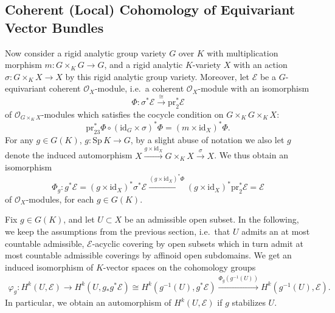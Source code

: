 \documentclass[a4paper, reqno, 10pt]{amsart}
\theoremstyle{definition}
\numberwithin{equation}{section}
\newcommand{\id}{{\mathrm{id}}}
\newcommand{\lra}{\longrightarrow}
\newcommand{\pr}{{\mathrm{pr}}}
\newcommand{\ra}{\rightarrow}
\newcommand{\Sp}{{\mathrm{Sp}}}
\newcommand{\CE}{{\mathcal {E}}}
\newcommand{\CO}{{\mathcal {O}}}
\begin{document}
\subsection{Coherent (Local) Cohomology of Equivariant Vector Bundles}\label{Sect 2 - Coherent Cohomology of Equivariant Vector Bundles}


Now consider a rigid analytic group variety $G$ over $K$ with multiplication morphism $m\colon G \times_K G \ra G$, and a rigid analytic $K$-variety $X$ with an action $\sigma \colon G \times_K X \ra X$ by this rigid analytic group variety.
Moreover, let $\CE$ be a $G$-equivariant coherent $\CO_X$-module, i.e.\ a coherent $\CO_X$-module with an isomorphism
\begin{equation*}
	\Phi \colon \sigma^\ast \CE \overset{\cong}{\lra} \pr_2^\ast \CE
\end{equation*}
of $\CO_{G\times_K X}$-modules which satisfies the cocycle condition on $G \times_K G \times_K X$:
\begin{equation*}
	\pr_{23}^{\ast} \Phi \circ (\mathrm{id}_G \times \sigma)^{\ast} \Phi = (m \times \mathrm{id}_{X})^{\ast} \Phi .
\end{equation*}
For any $g\in G(K)$, $g \colon \Sp\,K \ra G$, by a slight abuse of notation we also let $g$ denote the induced automorphism $X \xrightarrow{g \times \id_X} G \times_K X \xrightarrow{\sigma}  X$.
We thus obtain an isomorphism
\begin{equation*}
	\Phi_g \colon g^\ast \CE = (g\times \mathrm{id}_X)^\ast \sigma^\ast \CE \xrightarrow{(g\times \mathrm{id}_X)^\ast \Phi} (g\times \mathrm{id}_X)^{\ast} \pr_2^\ast \CE = \CE 
\end{equation*}
of $\CO_{X}$-modules, for each $g\in G(K)$.


Fix $g\in G(K)$, and let $U \subset X$ be an admissible open subset.
In the following, we keep the assumptions from the previous section, i.e.\ that $U$ admits an at most countable admissible, $\CE$-acyclic covering by open subsets which in turn admit at most countable admissible coverings by affinoid open subdomains.
We get an induced isomorphism of $K$-vector spaces on the cohomology groups
\begin{align}\label{Eq 2 - Group action isomorphism on cohomology}
	\varphi_g \colon H^k(U,\CE) \lra H^k(U,g_\ast g^\ast \CE) \cong H^k(g^{-1}(U), g^\ast \CE) \xrightarrow{\Phi_g (g^{-1}(U))} H^k(g^{-1}(U),\CE) .
\end{align}
In particular, we obtain an automorphism of $H^k(U,\CE)$ if $g$ stabilizes $U$.
\end{document}
